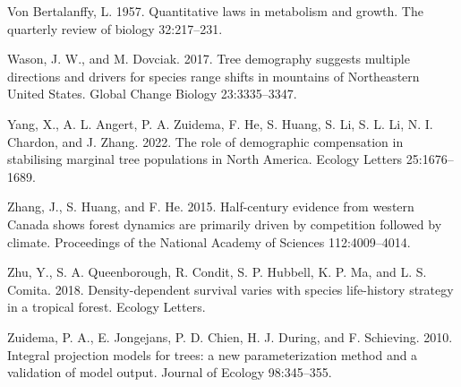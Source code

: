 \documentclass[12pt]{article}
\newlength{\cslhangindent}
\newenvironment{cslreferences}%
  {\setlength{\parindent}{0pt}%
  \everypar{\setlength{\hangindent}{\cslhangindent}}\ignorespaces}%
  {\par}
\begin{document}
\begin{cslreferences}
\leavevmode\hypertarget{ref-von1957quantitative}{}%
Von Bertalanffy, L. 1957. Quantitative laws in metabolism and growth.
The quarterly review of biology 32:217--231.

\leavevmode\hypertarget{ref-Wason2017}{}%
Wason, J. W., and M. Dovciak. 2017. Tree demography suggests multiple
directions and drivers for species range shifts in mountains of
Northeastern United States. Global Change Biology 23:3335--3347.

\leavevmode\hypertarget{ref-Yang2022}{}%
Yang, X., A. L. Angert, P. A. Zuidema, F. He, S. Huang, S. Li, S. L. Li,
N. I. Chardon, and J. Zhang. 2022. The role of demographic compensation
in stabilising marginal tree populations in North America. Ecology
Letters 25:1676--1689.

\leavevmode\hypertarget{ref-Zhang2015}{}%
Zhang, J., S. Huang, and F. He. 2015. Half-century evidence from western
Canada shows forest dynamics are primarily driven by competition
followed by climate. Proceedings of the National Academy of Sciences
112:4009--4014.

\leavevmode\hypertarget{ref-Zhu2018}{}%
Zhu, Y., S. A. Queenborough, R. Condit, S. P. Hubbell, K. P. Ma, and L.
S. Comita. 2018. Density-dependent survival varies with species
life-history strategy in a tropical forest. Ecology Letters.

\leavevmode\hypertarget{ref-zuidema2010integral}{}%
Zuidema, P. A., E. Jongejans, P. D. Chien, H. J. During, and F.
Schieving. 2010. Integral projection models for trees: a new
parameterization method and a validation of model output. Journal of
Ecology 98:345--355.
\end{cslreferences}


\newpage
\end{document}
